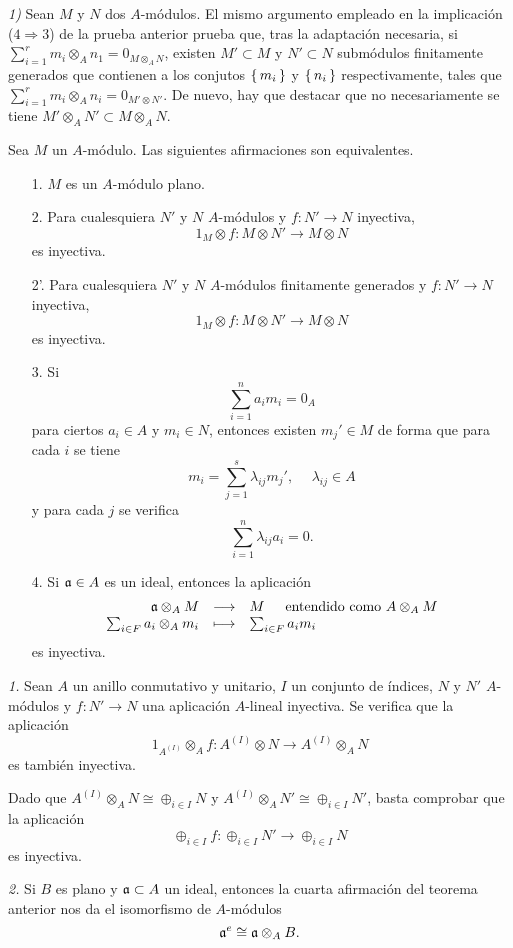 \documentclass[../main.tex]{subfiles}
\begin{document}
\begin{remark}
	\textit{1)} Sean $M$ y $N$ dos $A$-módulos. El mismo argumento empleado en la implicación ($4\Rightarrow 3$) de la prueba anterior prueba que, tras la adaptación necesaria, si $\sum_{i=1}^r m_i\otimes_A n_1=0_{M\otimes_A N}$, existen $M'\subset M$ y $N'\subset N$ submódulos finitamente generados que contienen a los conjutos $\set{m_i}$ y $\set{n_i}$ respectivamente, tales que $\sum_{i=1}^r m_i\otimes_A n_i=0_{M'\otimes N'}$. De nuevo, hay que destacar que no necesariamente se tiene $M'\otimes_A N'\subset M\otimes_A N$.
\end{remark}

\begin{theorem}Sea $M$ un $A$-módulo. Las siguientes afirmaciones son equivalentes.
	\begin{itemize}
		\item[1.] $M$ es un $A$-módulo plano.
		\item[2.] Para cualesquiera $N'$ y $N$ $A$-módulos y $f:N'\longrightarrow N$ inyectiva, $$1_M\otimes f:M\otimes N'\longrightarrow M\otimes N$$ es inyectiva.
		\item[2'.] Para cualesquiera $N'$ y $N$ $A$-módulos finitamente generados y $f:N'\longrightarrow N$ inyectiva, $$1_M\otimes f:M\otimes N'\longrightarrow M\otimes N$$ es inyectiva.
		\item[3.] Si $$\sum_{i=1}^na_im_i=0_A$$ para ciertos $a_i\in A$ y $m_i\in N$, entonces existen ${m_j}'\in M$ de forma que para cada $i$ se tiene $$m_i=\sum_{j=1}^s\lambda_{ij}{m_j}',\hspace{15pt}\lambda_{ij}\in A$$ y para cada $j$ se verifica $$\sum_{i=1}^n\lambda_{ij}a_i=0.$$
		\item[4.] Si $\mathfrak{a}\in A$ es un ideal, entonces la aplicación
		$$\begin{array}{rcl}
		\af\otimes_A M&\longrightarrow&M\hspace{15pt}\text{entendido como}\ A\otimes_A M\\
		\sum_{i\in F}a_i\otimes_A m_i&\longmapsto&\sum_{i\in F}a_im_i 
		\end{array}$$
		es inyectiva.
	\end{itemize}
\end{theorem}

\begin{remark}\textit{1.} Sean $A$ un anillo conmutativo y unitario, $I$ un conjunto de índices, $N$ y $N'$ $A$-módulos y $f:N'\longrightarrow N$ una aplicación $A$-lineal inyectiva. Se verifica que la aplicación $$1_{A^{(I)}}\otimes_A f:A^{(I)}\otimes N\longrightarrow A^{(I)}\otimes_A N$$ es también inyectiva.
	
	Dado que $A^{(I)}\otimes_A N\cong\oplus_{i\in I}N$ y $A^{(I)}\otimes_A N'\cong\oplus_{i\in I}N'$, basta comprobar que la aplicación $$\oplus_{i\in I}f:\oplus_{i\in I}N'\longrightarrow \oplus_{i\in I}N$$ es inyectiva.
	
	\textit{2.} Si $B$ es plano y $\mathfrak{a}\subset A$ un ideal, entonces la cuarta afirmación del teorema anterior nos da el isomorfismo de $A$-módulos $$\mathfrak{a}^e\cong \mathfrak{a}\otimes_A B.$$
\end{remark}
\end{document}
